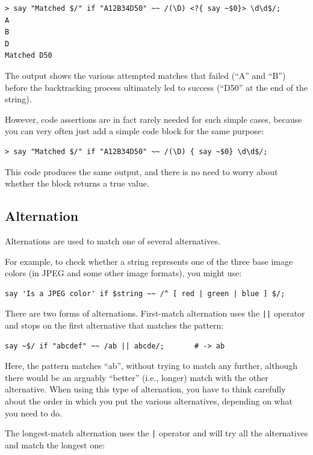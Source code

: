 \begin{verbatim}
> say "Matched $/" if "A12B34D50" ~~ /(\D) <?{ say ~$0}> \d\d$/;
A
B
D
Matched D50
\end{verbatim}

The output shows the various attempted matches that 
failed (``A'' and ``B'') before the backtracking 
process ultimately led to success (``D50'' at the end 
of the string).

However, code assertions are in fact rarely needed for 
such simple cases, because you can very often just add 
a simple code block for the same purpose:
%
\begin{verbatim}
> say "Matched $/" if "A12B34D50" ~~ /(\D) { say ~$0} \d\d$/;
\end{verbatim}
This code produces the same output, and there is no need 
to worry about whether the block returns a true value.


\subsection{Alternation}

Alternations are used to match one of several alternatives.

For example, to check whether a string represents one of the 
three base image colors (in JPEG and some other image formats), 
you might use:

\begin{verbatim}
say 'Is a JPEG color' if $string ~~ /^ [ red | green | blue ] $/;
\end{verbatim}
%

There are two forms of alternations. First-match alternation 
uses the \verb'||' operator and stops on the first alternative 
that matches the pattern:

\begin{verbatim}
say ~$/ if "abcdef" ~~ /ab || abcde/;       # -> ab
\end{verbatim}
%

Here, the pattern matches ``ab'', without trying to match 
any further, although there would be an arguably ``better'' 
(i.e., longer) match with the other alternative. When using 
this type of alternation, you have to think carefully about 
the order in which you put the various alternatives, 
depending on what you need to do.

The longest-match alternation uses the \verb'|' operator 
and will try all the alternatives and match the longest one:

